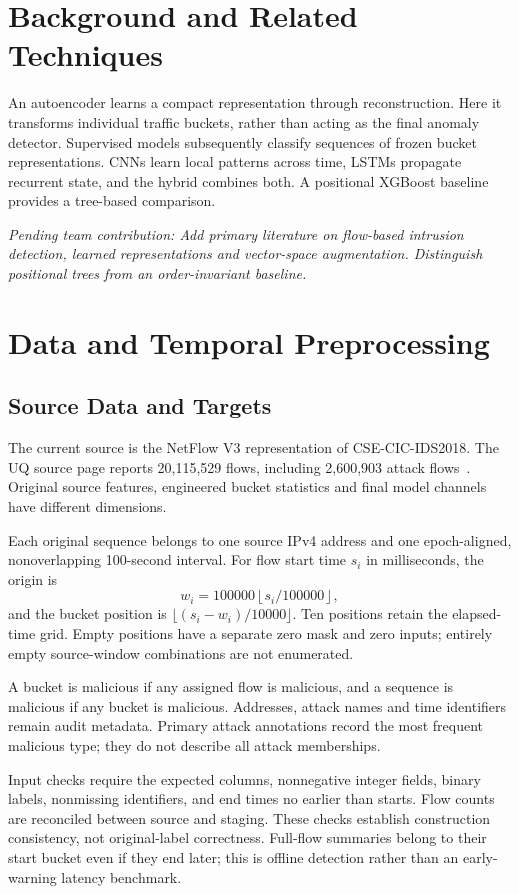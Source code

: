 \documentclass[conference]{IEEEtran}
\newcommand{\pending}[1]{\par\noindent\textit{Pending team contribution: #1}\par}
\begin{document}
\section{Background and Related Techniques}
An autoencoder learns a compact representation through reconstruction. Here it transforms individual traffic buckets, rather than acting as the final anomaly detector. Supervised models subsequently classify sequences of frozen bucket representations. CNNs learn local patterns across time, LSTMs propagate recurrent state, and the hybrid combines both. A positional XGBoost baseline provides a tree-based comparison.
\pending{Add primary literature on flow-based intrusion detection, learned representations and vector-space augmentation. Distinguish positional trees from an order-invariant baseline.}

\section{Data and Temporal Preprocessing}
\subsection{Source Data and Targets}
The current source is the NetFlow V3 representation of CSE-CIC-IDS2018. The UQ source page reports 20,115,529 flows, including 2,600,903 attack flows~\cite{uqdata}. Original source features, engineered bucket statistics and final model channels have different dimensions.

Each original sequence belongs to one source IPv4 address and one epoch-aligned, nonoverlapping 100-second interval. For flow start time $s_i$ in milliseconds, the origin is
\begin{equation}
w_i=100000\left\lfloor s_i/100000\right\rfloor,
\end{equation}
and the bucket position is $\lfloor(s_i-w_i)/10000\rfloor$. Ten positions retain the elapsed-time grid. Empty positions have a separate zero mask and zero inputs; entirely empty source-window combinations are not enumerated.

A bucket is malicious if any assigned flow is malicious, and a sequence is malicious if any bucket is malicious. Addresses, attack names and time identifiers remain audit metadata. Primary attack annotations record the most frequent malicious type; they do not describe all attack memberships.

Input checks require the expected columns, nonnegative integer fields, binary labels, nonmissing identifiers, and end times no earlier than starts. Flow counts are reconciled between source and staging. These checks establish construction consistency, not original-label correctness. Full-flow summaries belong to their start bucket even if they end later; this is offline detection rather than an early-warning latency benchmark.
\end{document}
